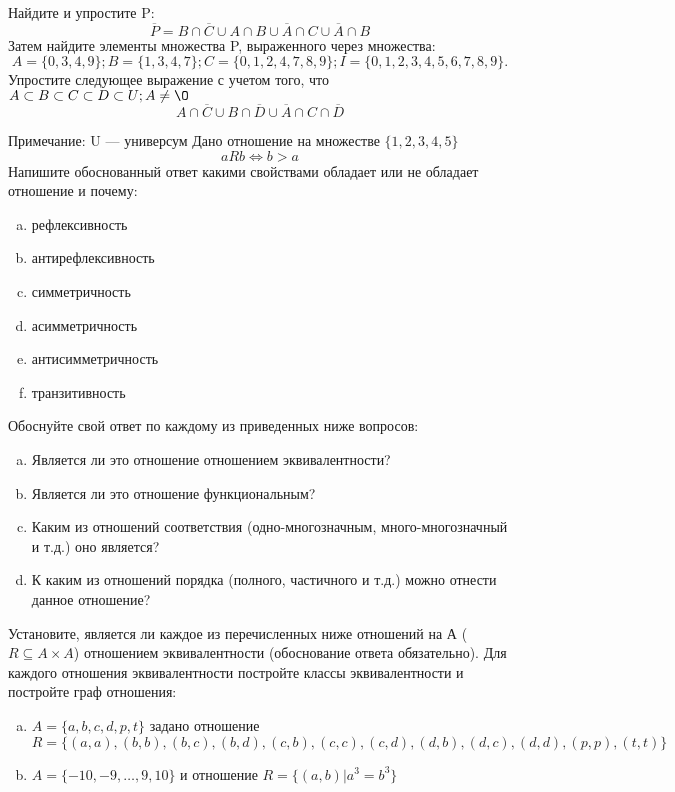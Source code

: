 \documentclass[10pt]{exam}
\begin{document}
\begin{questions}
\question
Найдите и упростите P:
\begin{equation*}
\overline{P} = B \cap \overline{C} \cup A \cap B \cup \overline{A} \cap C \cup \overline{A} \cap B
\end{equation*}
Затем найдите элементы множества P, выраженного через множества:
\begin{equation*}
A = \{0, 3, 4, 9\}; 
B = \{1, 3, 4, 7\};
C = \{0, 1, 2, 4, 7, 8, 9\};
I = \{0, 1, 2, 3, 4, 5, 6, 7, 8, 9\}.
\end{equation*}\question
Упростите следующее выражение с учетом того, что $A\subset B \subset C \subset D \subset U; A \neq \O$
\begin{equation*}
A \cap  \overline{C} \cup B \cap \overline{D} \cup  \overline{A} \cap C \cap  \overline{D}
\end{equation*}

Примечание: U — универсум\question
Дано отношение на множестве $\{1, 2, 3, 4, 5\}$ 
\begin{equation*}
aRb \iff b > a
\end{equation*}
Напишите обоснованный ответ какими свойствами обладает или не обладает отношение и почему:   
\begin{enumerate} [a)]\setcounter{enumi}{0}
\item рефлексивность
\item антирефлексивность
\item симметричность
\item асимметричность
\item антисимметричность
\item транзитивность
\end{enumerate}

Обоснуйте свой ответ по каждому из приведенных ниже вопросов:
\begin{enumerate} [a)]\setcounter{enumi}{0}
    \item Является ли это отношение отношением эквивалентности?
    \item Является ли это отношение функциональным?
    \item Каким из отношений соответствия (одно-многозначным, много-многозначный и т.д.) оно является?
    \item К каким из отношений порядка (полного, частичного и т.д.) можно отнести данное отношение?
\end{enumerate}

\question
Установите, является ли каждое из перечисленных ниже отношений на А ($R \subseteq A \times A$) отношением эквивалентности (обоснование ответа обязательно). Для каждого отношения эквивалентности постройте классы 
эквивалентности и постройте граф отношения:
\begin{enumerate} [a)]\setcounter{enumi}{0}
\item $A = \{a, b, c, d, p, t\}$ задано отношение $R = \{(a, a), (b, b), (b, c), (b, d), (c, b), (c, c), (c, d), (d, b), (d, c), (d, d), (p,p), (t,t)\}$
\item $A = \{-10, -9, … , 9, 10\}$ и отношение $R = \{(a,b)|a^{3} = b^{3}\}$


\end{enumerate}
\end{questions}
\end{document}
